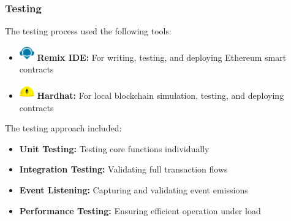 \subsubsection{Testing}

The testing process used the following tools:

\begin{itemize}
    \item \includegraphics[width=0.05\textwidth]{images/icons/remix.png} \textbf{Remix IDE:} For writing, testing, and deploying Ethereum smart contracts
    \item \includegraphics[width=0.05\textwidth]{images/icons/hardhat.png} \textbf{Hardhat:} For local blockchain simulation, testing, and deploying contracts
\end{itemize}

The testing approach included:

\begin{itemize}
    \item \textbf{Unit Testing:} Testing core functions individually
    \item \textbf{Integration Testing:} Validating full transaction flows
    \item \textbf{Event Listening:} Capturing and validating event emissions
    \item \textbf{Performance Testing:} Ensuring efficient operation under load \cite{Parizi2018SmartContractProgramming}
\end{itemize}

